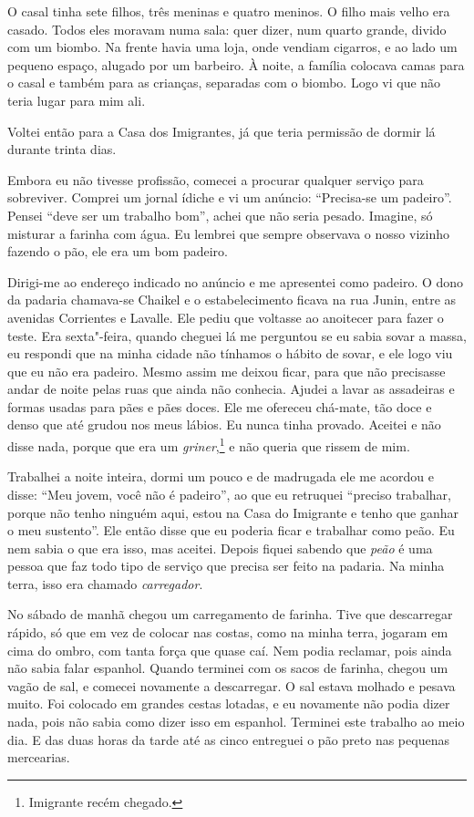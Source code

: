 O casal tinha sete filhos, três meninas e quatro meninos. O filho mais
velho era casado. Todos eles moravam numa sala: quer dizer, num quarto
grande, divido com um biombo. Na frente havia uma loja, onde vendiam cigarros, e ao lado um pequeno espaço, alugado por um
barbeiro. À noite, a família colocava camas para o casal e também para as
crianças, separadas com o biombo. Logo vi que não teria lugar para
mim ali.

Voltei então para a Casa dos Imigrantes, já que teria permissão de dormir
lá durante trinta dias.

Embora eu não tivesse profissão, comecei a procurar qualquer
serviço para sobreviver. Comprei um jornal ídiche e vi um anúncio:
``Precisa-se um padeiro''. Pensei ``deve ser um trabalho bom'', achei
que não seria pesado. Imagine, só misturar a farinha com água. Eu
lembrei que sempre observava o nosso vizinho fazendo o pão, ele era um
bom padeiro.

Dirigi-me ao endereço indicado no anúncio e me apresentei como padeiro.
O dono da padaria chamava-se Chaikel e o estabelecimento ficava na rua
Junin, entre as avenidas Corrientes e Lavalle. Ele pediu que voltasse ao
anoitecer para fazer o teste. Era sexta"-feira, quando cheguei lá me
perguntou se eu sabia sovar a massa, eu respondi que na minha cidade não
tínhamos o hábito de sovar, e ele logo viu que eu não era padeiro.
Mesmo assim me deixou ficar, para que não precisasse andar de noite pelas ruas que
ainda não conhecia. Ajudei a lavar as assadeiras e formas usadas para pães e pães doces. Ele me ofereceu chá-mate, tão doce e denso que até grudou nos
meus lábios. Eu nunca tinha provado. Aceitei e não disse nada, porque
que era um \textit{griner},\footnote{Imigrante recém chegado.} e não queria
que rissem de mim.

Trabalhei a noite inteira, dormi um pouco e de madrugada ele me acordou
e disse: ``Meu jovem, você não é padeiro'', ao que eu retruquei ``preciso
trabalhar, porque não tenho ninguém aqui, estou na Casa do Imigrante e
tenho que ganhar o meu sustento''. Ele então disse que eu poderia ficar
e trabalhar como peão. Eu nem sabia o que era isso, mas aceitei. Depois
fiquei sabendo que \textit{peão} é uma pessoa que faz todo tipo de serviço
que precisa ser feito na padaria. Na minha terra, isso era chamado \textit{carregador}.

No sábado de manhã chegou um carregamento de farinha. Tive que descarregar
rápido, só que em vez de colocar nas costas, como na minha terra,
jogaram em cima do ombro, com tanta força que quase caí. Nem podia
reclamar, pois ainda não sabia falar espanhol. Quando terminei com os
sacos de farinha, chegou um vagão de sal, e comecei novamente a
descarregar. O sal estava molhado e pesava muito. Foi colocado em
grandes cestas lotadas, e eu novamente não podia dizer nada, pois não
sabia como dizer isso em espanhol. Terminei este trabalho ao meio dia. E das duas horas da tarde até as cinco entreguei o pão preto nas pequenas mercearias. 

